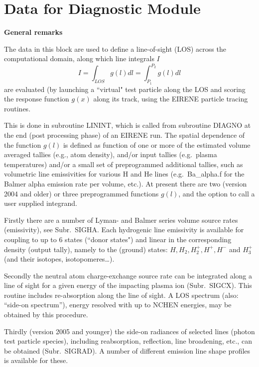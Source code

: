\section{Data for Diagnostic Module} \label{sec2.12}

\textbf{General remarks} 

\medskip 

The data in this block are used to define a line-of-sight (LOS) across the
computational domain, along which line integrals $I$
\begin{equation}
  \label{eqLOS} I = \int_{LOS} g(l) dl = \int_{P_1}^{P_2} g(l) dl
\end{equation}
are evaluated (by launching a ``virtual" test particle along the LOS and
scoring the response function $g(x)$ along its track, using the EIRENE particle
tracing routines.
%

This is done in subroutine LININT, which is called from subroutine DIAGNO at
the end (post processing phase) of an EIRENE run.
The spatial dependence of the function $g(l)$ is defined as function of one or
more of the estimated volume averaged tallies (e.g., atom density), and/or
input tallies (e.g.\ plasma temperatures) and/or a small set of preprogrammed
additional tallies, such as volumetric line emissivities for various H and He
lines (e.g.\ Ba\_alpha.f for the Balmer alpha emission rate per volume, etc.).
At present there are two (version 2004 and older) or three preprogrammed
functions $g(l)$, and the option to call a user supplied integrand.

Firstly there are a number of Lyman- and Balmer series volume source rates
(emissivity), see Subr.\ SIGHA.
Each hydrogenic line emissivity is available for coupling to up to 6 states
(``donor states") and linear in the corresponding density (output tally),
namely to the (ground) states:
$H, H_2, H_2^+, H^+, H^-$ and $H_3^+$	(and their isotopes,
isotopomeres\dots).

Secondly the neutral atom charge-exchange source rate can be integrated along a
line of sight for a given energy of the impacting plasma ion (Subr.\ SIGCX).
This routine includes re-absorption along the line of sight.
A LOS spectrum (also: ``side-on spectrum''), energy resolved with up to NCHEN
energies, may be obtained by this procedure.

Thirdly (version 2005 and younger) the side-on radiances of selected lines
(photon test particle species), including reabsorption, reflection, line
broadening, etc., can be obtained (Subr.\ SIGRAD).
A number of different emission line shape profiles is available for these.

